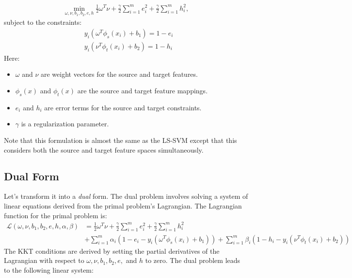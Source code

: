 \begin{align*}
	\min_{\omega, \nu, b_1, b_2, e, h} \frac{1}{2} \omega^T \nu + \frac{\gamma}{2} \sum_{i=1}^m e_i^2 + \frac{\gamma}{2} \sum_{i=1}^m h_i^2, 
\end{align*}
subject to the constraints:
\begin{align*}
	& y_i (\omega^T \phi_s(x_i) + b_1) = 1 - e_i\\
	& y_i (\nu^T \phi_t(x_i) + b_2) = 1 - h_i
\end{align*}
Here:
\begin{itemize}
	\item \( \omega \) and \( \nu \) are weight vectors for the source and target features.
	\item \( \phi_s(x) \) and \( \phi_t(x) \) are the source and target feature mappings.
	\item \( e_i \) and \( h_i \) are error terms for the source and target constraints.
	\item \( \gamma \) is a regularization parameter.
\end{itemize}
Note that this formulation is almost the same as the LS-SVM except that this considers both the source and target feature spaces simultaneously.

\subsection{Dual Form}
Let's transform it into a \textit{dual} form. The dual problem involves solving a system of linear equations derived from the primal problem's Lagrangian. The Lagrangian function for the primal problem is:
\begin{align*}
	\mathcal{L}( \omega, \nu, b_1, b_2, e, h, \alpha, \beta) &= \frac{1}{2} \omega^T \nu + \frac{\gamma}{2} \sum_{i=1}^m e_i^2 + \frac{\gamma}{2} \sum_{i=1}^m h_i^2\\ 
		   &+ \sum_{i=1}^m \alpha_i (1 - e_i - y_i (\omega^T \phi_s(x_i) + b_1)) + \sum_{i=1}^m \beta_i (1 - h_i - y_i (\nu^T \phi_t(x_i) + b_2))
\end{align*}
The KKT conditions are derived by setting the partial derivatives of the Lagrangian with respect to \( \omega, \nu, b_1, b_2, e, \) and \( h \) to zero. The dual problem leads to the following linear system:

